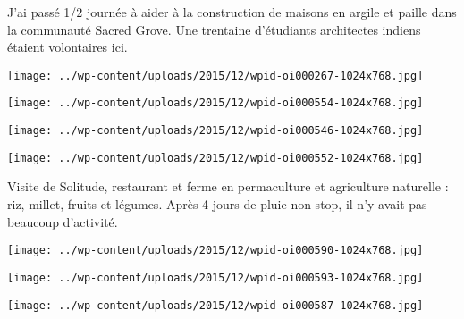 J'ai passé 1/2 journée à aider à la construction de maisons en argile et paille dans la communauté Sacred Grove. Une trentaine d'étudiants architectes indiens étaient volontaires ici. 
\begin{center} \texttt{[image: ../wp-content/uploads/2015/12/wpid-oi000267-1024x768.jpg]} \end{center}
\begin{center} \texttt{[image: ../wp-content/uploads/2015/12/wpid-oi000554-1024x768.jpg]} \end{center}
\begin{center} \texttt{[image: ../wp-content/uploads/2015/12/wpid-oi000546-1024x768.jpg]} \end{center}
\begin{center} \texttt{[image: ../wp-content/uploads/2015/12/wpid-oi000552-1024x768.jpg]} \end{center}

 Visite de Solitude, restaurant et ferme en permaculture et agriculture naturelle : riz, millet, fruits et légumes. Après 4 jours de pluie non stop, il n'y avait pas beaucoup d'activité. 
\begin{center} \texttt{[image: ../wp-content/uploads/2015/12/wpid-oi000590-1024x768.jpg]} \end{center}
\begin{center} \texttt{[image: ../wp-content/uploads/2015/12/wpid-oi000593-1024x768.jpg]} \end{center}
\begin{center} \texttt{[image: ../wp-content/uploads/2015/12/wpid-oi000587-1024x768.jpg]} \end{center}